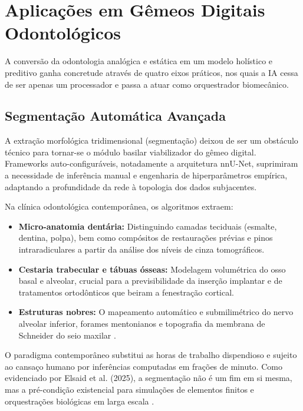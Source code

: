 \section{Aplicações em Gêmeos Digitais Odontológicos}
\label{sec:ia-aplicacoes}

A conversão da odontologia analógica e estática em um modelo holístico e preditivo ganha concretude através de quatro eixos práticos, nos quais a IA cessa de ser apenas um processador e passa a atuar como orquestrador biomecânico.

\subsection{Segmentação Automática Avançada}
\label{subsec:segmentacao}

A extração morfológica tridimensional (segmentação) deixou de ser um obstáculo técnico para tornar-se o módulo basilar viabilizador do gêmeo digital. Frameworks auto-configuráveis, notadamente a arquitetura nnU-Net, suprimiram a necessidade de inferência manual e engenharia de hiperparâmetros empírica, adaptando a profundidade da rede à topologia dos dados subjacentes.

Na clínica odontológica contemporânea, os algoritmos extraem:
\begin{itemize}
\item \textbf{Micro-anatomia dentária:} Distinguindo camadas teciduais (esmalte, dentina, polpa), bem como compósitos de restaurações prévias e pinos intraradiculares a partir da análise dos níveis de cinza tomográficos.
\item \textbf{Cestaria trabecular e tábuas ósseas:} Modelagem volumétrica do osso basal e alveolar, crucial para a previsibilidade da inserção implantar e de tratamentos ortodônticos que beiram a fenestração cortical.
\item \textbf{Estruturas nobres:} O mapeamento automático e submilimétrico do nervo alveolar inferior, forames mentonianos e topografia da membrana de Schneider do seio maxilar \cite{olawade2026advancing}.
\end{itemize}

O paradigma contemporâneo substitui as horas de trabalho dispendioso e sujeito ao cansaço humano por inferências computadas em frações de minuto. Como evidenciado por Elsaid et al. (2025), a segmentação não é um fim em si mesma, mas a pré-condição existencial para simulações de elementos finitos e orquestrações biológicas em larga escala \cite{elsaid2025digital}.

